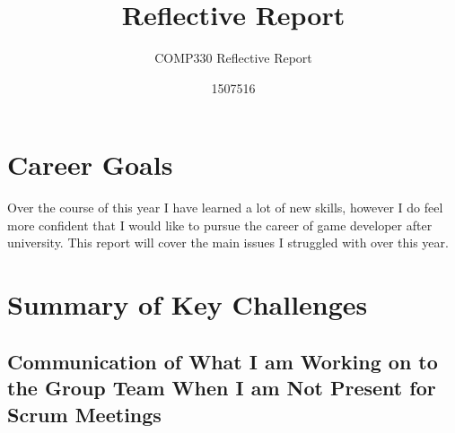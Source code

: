 \documentclass{scrartcl}
\title{Reflective Report}
\subtitle{COMP330 Reflective Report}
\author{1507516}
\begin{document}
\maketitle


\section{Career Goals}
Over the course of this year I have learned a lot of new skills, however I do feel more confident that I would like to pursue the career of game developer after university.
This report will cover the main issues I struggled with over this year.


\section{Summary of Key Challenges}


\subsection{Communication of What I am Working on to the Group Team When I am Not Present for Scrum Meetings}
\end{document}

